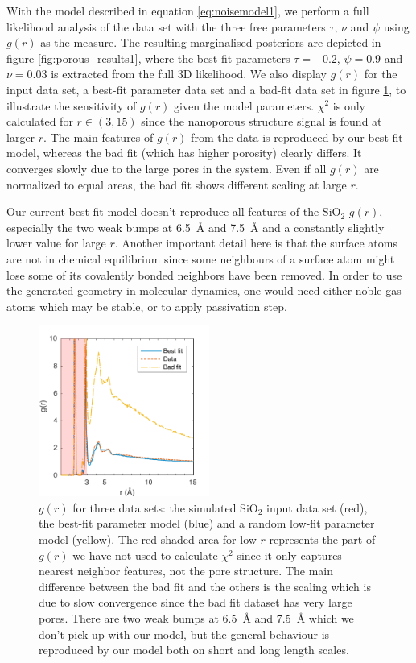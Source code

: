 \documentclass[aps,pre,twocolumn,letterpaper,floatfix,showpacs]{revtex4}
\begin{document}
With the model described in equation \ref{eq:noisemodel1}, we perform a full likelihood
analysis of the data set with the three free parameters $\tau$, $\nu$ and $\psi$ using $g(r)$ as the measure. 
The resulting marginalised posteriors are depicted in figure \ref{fig:porous_results1},
where the best-fit parameters $\tau=-0.2$, $\psi=0.9$ and $\nu=0.03$ is extracted from the full 3D likelihood. 
We also display $g(r)$ for the input data set, a best-fit parameter data set and a
bad-fit data set in figure \ref{fig:gofr1}, to illustrate the sensitivity of $g(r)$ given the model parameters.
$\chi^2$ is only calculated for $r\in (3,15)$ since the nanoporous structure signal is found at larger $r$.
The main features of $g(r)$ from the data is reproduced by our best-fit model, whereas the bad fit (which has higher porosity) clearly differs.
It converges slowly due to the large pores in the system. Even if all $g(r)$ are normalized to equal areas, the bad fit shows different scaling at large $r$.

Our current best fit model doesn't reproduce all features of the SiO$_2$ $g(r)$, especially the two weak bumps at \SI{6.5}{\angstrom} and \SI{7.5}{\angstrom} and a constantly slightly lower value for large $r$.
Another important detail here is that the surface atoms are not in chemical equilibrium since some neighbours of a surface atom might lose some of its covalently bonded neighbors have been removed. 
In order to use the generated geometry in molecular dynamics, one would need either noble gas atoms which may be stable, or to apply passivation step.

\begin{figure}
\includegraphics[width=0.5\textwidth]{gofr_figure.pdf}
\caption{$g(r)$ for three data sets: the simulated SiO$_2$ input data set (red), the best-fit parameter model (blue) and a random low-fit parameter model (yellow).
The red shaded area for low $r$ represents the part of $g(r)$ we have not used to calculate $\chi^2$ since it only captures nearest neighbor features, not the pore structure.
The main difference between the bad fit and the others is the scaling which is due to slow convergence since the bad fit dataset has very large pores.
There are two weak bumps at \SI{6.5}{\angstrom} and \SI{7.5}{\angstrom} which we don't pick up with our model, but the general behaviour is reproduced by our model both on short and long length scales.}
\label{fig:gofr1}
\end{figure}
\end{document}
